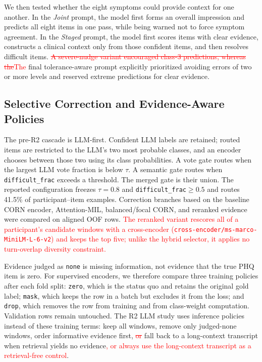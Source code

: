 \documentclass{article}
\DeclareRobustCommand{\rev}[1]{\textcolor{red}{#1}}
\DeclareRobustCommand{\del}[1]{\textcolor{red}{\sout{#1}}}
\begin{document}
We then tested whether the eight symptoms could provide context for one another. In the \emph{Joint} prompt, the model first forms an overall impression and predicts all eight items in one pass, while being warned not to force symptom agreement. In the \emph{Staged} prompt, the model first scores items with clear evidence, constructs a clinical context only from those confident items, and then resolves difficult items. \del{A severe-nudge variant encouraged class-3 predictions, whereas the}\rev{The} final tolerance-aware prompt explicitly prioritized avoiding errors of two or more levels and reserved extreme predictions for clear evidence.

\subsection{Selective Correction and Evidence-Aware Policies}
\label{subsec:cascade-policies}
The pre-R2 cascade is LLM-first. Confident LLM labels are retained; routed items are restricted to the LLM's two most probable classes, and an encoder chooses between those two using its class probabilities. A vote gate routes when the largest LLM vote fraction is below $\tau$. A semantic gate routes when \texttt{difficult\_frac} exceeds a threshold. The merged gate is their union. The reported configuration freezes $\tau=0.8$ and \texttt{difficult\_frac}$\geq0.5$ and routes 41.5\% of participant--item examples. Correction branches based on the baseline CORN encoder, Attention-MIL, balanced/focal CORN, and reranked evidence were compared on aligned OOF rows. \rev{The reranked variant rescores all of a participant's candidate windows with a cross-encoder (\texttt{cross-encoder/ms-marco-MiniLM-L-6-v2}) \cite{nogueira2019passage} and keeps the top five; unlike the hybrid selector, it applies no turn-overlap diversity constraint.}

Evidence judged as \texttt{none} is missing information, not evidence that the true PHQ item is zero. For supervised encoders, we therefore compare three training policies after each fold split: \texttt{zero}, which is the status quo and retains the original gold label; \texttt{mask}, which keeps the row in a batch but excludes it from the loss; and \texttt{drop}, which removes the row from training and from class-weight computation. Validation rows remain untouched. The R2 LLM study uses inference policies instead of these training terms: keep all windows, remove only judged-none windows, order informative evidence first, \del{or} fall back to a long-context transcript when retrieval yields no evidence\rev{, or always use the long-context transcript as a retrieval-free control}.
\end{document}
